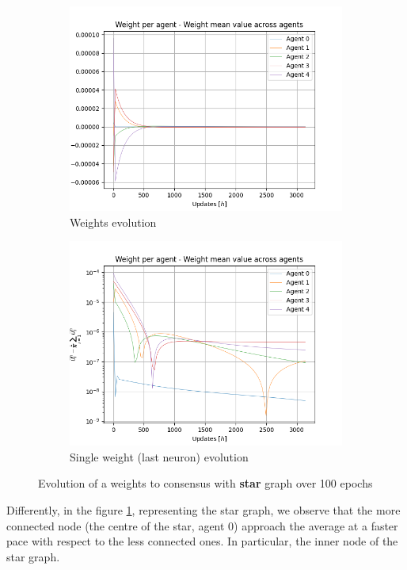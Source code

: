 \documentclass[a4paper,11pt,oneside]{book}
\begin{document}
\begin{figure}[h]
\centering
	\begin{subfigure}{0.49\textwidth}	
	\includegraphics[width=\textwidth]{star/weight_100}
	\caption{Weights evolution}
	\end{subfigure}
\hfill
	\begin{subfigure}{0.49\textwidth}	
	\includegraphics[width=\textwidth]{star/weight_100_log}
	\caption{Single weight (last neuron) evolution}
	\end{subfigure}
\caption{Evolution of a weights to consensus with \textbf{star} graph over 100 epochs}
\label{star_test}
\end{figure}

Differently, in the figure \ref{star_test}, representing the star graph, we observe that the more connected node (the centre of the star, agent 0) approach the average at a faster pace with respect to the less connected ones. In particular, the inner node of the star graph.
\end{document}
